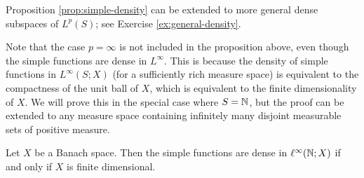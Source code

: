 \begin{rmk}
  Proposition \ref{prop:simple-density} can be extended to more general dense subspaces of $L^p(S)$; see Exercise \ref{ex:general-density}.
\end{rmk}

Note that the case $p = \infty$ is not included in the proposition above, even though the simple functions are dense in $L^\infty$.
This is because the density of simple functions in $L^\infty(S;X)$ (for a sufficiently rich measure space) is equivalent to the compactness of the unit ball of $X$, which is equivalent to the finite dimensionality of $X$.
We will prove this in the special case where $S = \mathbb{N}$, but the proof can be extended to any measure space containing infinitely many disjoint measurable sets of positive measure.

\begin{prop}
  Let $X$ be a Banach space.
  Then the simple functions are dense in $\ell^\infty(\mathbb{N};X)$ if and only if $X$ is finite dimensional.
\end{prop}

